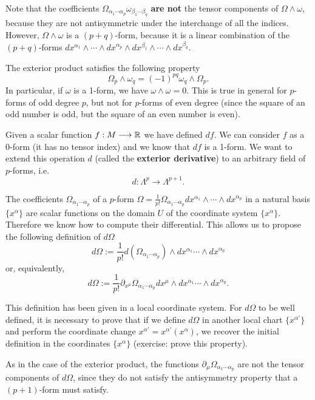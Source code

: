 \begin{points}
\item Note that the coefficients $\Omega_{\alpha_1\cdots\alpha_p}\omega_{\beta_1\cdots\beta_q}$ \textbf{are not} the tensor components of $\Omega\wedge\omega$, because they are not antisymmetric under the interchange of all the indices. However, $\Omega\wedge\omega$ is a $(p+q)$-form, because it is a linear combination of the $(p+q)$-forms $dx^{\alpha_1}\wedge\cdots\wedge dx^{\alpha_p}\wedge dx^{\beta_1}\wedge\cdots\wedge dx^{\beta_q}$.

\item The exterior product satisfies the following property
\[
  \Omega_p\wedge\omega_q=(-1)^{pq}\omega_q\wedge\Omega_p .
\]
In particular, if $\omega$ is a 1-form, we have $\omega\wedge\omega=0$. This is true in general for $p$-forms of odd degree $p$, but not for $p$-forms of even degree (since the square of an odd number is odd, but the square of an even number is even).

\item Given a scalar function $f:M\longrightarrow\mathbb{R}$ we have defined $df$. We can consider $f$ as a 0-form (it has no tensor index) and we know that $df$ is a 1-form. We want to extend this operation $d$ (called the \textbf{exterior derivative}) to an arbitrary field of $p$-forms, i.e.
\[
  d:\Lambda^p\longrightarrow\Lambda^{p+1}.
\]

\item The coefficients $\Omega_{\alpha_1\cdots\alpha_p}$ of a $p$-form $\Omega=\frac{1}{p!}\Omega_{\alpha_1\cdots\alpha_p}dx^{\alpha_1}\wedge\cdots\wedge dx^{\alpha_p}$ in a natural basis $\{x^\alpha\}$ are scalar functions on the domain $U$ of the coordinate system $\{x^\alpha\}$. Therefore we know how to compute their differential. This allows us to propose the following definition of $d\Omega$
\[
  d\Omega:=\frac{1}{p!}d\left(\Omega_{\alpha_1\cdots\alpha_p}\right)\wedge dx^{\alpha_1}\cdots\wedge dx^{\alpha_p}
\]
or, equivalently,
\[
  d\Omega:=\frac{1}{p!}\partial_{x^\mu}\Omega_{\alpha_1\cdots\alpha_p}dx^\mu\wedge dx^{\alpha_1}\cdots\wedge dx^{\alpha_p}.
\]

\item This definition has been given in a local coordinate system. For $d\Omega$ to be well defined, it is necessary to prove that if we define $d\Omega$ in another local chart $\{x^{\alpha'}\}$ and perform the coordinate change $x^{\alpha'}=x^{\alpha'}(x^\alpha)$, we recover the initial definition in the coordinates $\{x^\alpha\}$ (exercise: prove this property).

\item As in the case of the exterior product, the functions $\partial_\mu\Omega_{\alpha_1\cdots\alpha_p}$ are not the tensor components of $d\Omega$, since they do not satisfy the antisymmetry property that a $(p+1)$-form must satisfy.


\end{points}
